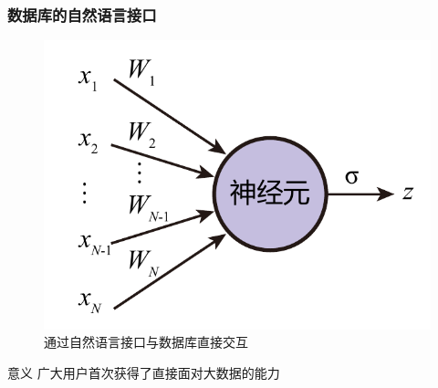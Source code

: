 \documentclass{ctexbeamer}
\begin{document}
\begin{frame}
  \frametitle{数据库的自然语言接口}
  \begin{figure}
    \includegraphics[page=11]{figure/figures.pdf}
    \caption{通过自然语言接口与数据库直接交互}
  \end{figure}
  \begin{block}{意义}
    广大用户首次获得了直接面对大数据的能力
  \end{block}
\end{frame}
\end{document}
